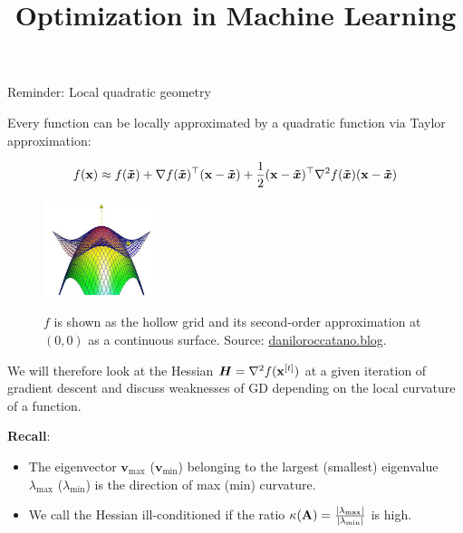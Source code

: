 \documentclass[11pt,compress,t,notes=noshow, xcolor=table]{beamer}
\title{Optimization in Machine Learning}
\date{}
\begin{document}
\sloppy

\begin{vbframe}{Reminder: Local quadratic geometry}

Every function can be locally approximated by a quadratic function via Taylor approximation: 

\vspace*{-0.3cm}

$$
f(\mathbf{x}) \approx f(\bm{\tilde{x}}) + \nabla f(\bm{\tilde{x}})^\top(\mathbf{x}-\bm{\tilde{x}}) +
\frac 12(\mathbf{x}-\bm{\tilde{x}})^\top\nabla^2 f(\bm{\tilde{x}})(\mathbf{x}-\bm{\tilde{x}})
$$

\begin{figure}
	\includegraphics[width=0.3\textwidth]{figure_man/taylor_2D_quadratic.png} \\
	\begin{footnotesize} 
	$f$ is shown as the hollow grid and its second-order approximation at $(0, 0)$ as a continuous surface. Source: \url{daniloroccatano.blog}.
	\end{footnotesize}
\end{figure}

\framebreak 



We will therefore look at the Hessian $\bm{H} = \nabla^2 f(\mathbf{x}^{[t]})$ at a given iteration of gradient descent and discuss weaknesses of GD depending on the local curvature of a function. 

\vspace{0.2cm} 

\textbf{Recall}:
\begin{itemize}
	\item The eigenvector $\textbf{v}_\text{max}$ ($\textbf{v}_\text{min}$) belonging to the largest (smallest) eigenvalue $\lambda_\text{max}$ ($\lambda_\text{min}$) is the direction of max (min) curvature. 
	\item We call the Hessian ill-conditioned if the ratio $\kappa(\mathbf{A}) = \frac{|\lambda_\text{max}|}{|\lambda_\text{min}|}$ is high. 
\end{itemize}


\end{vbframe}
\end{document}
